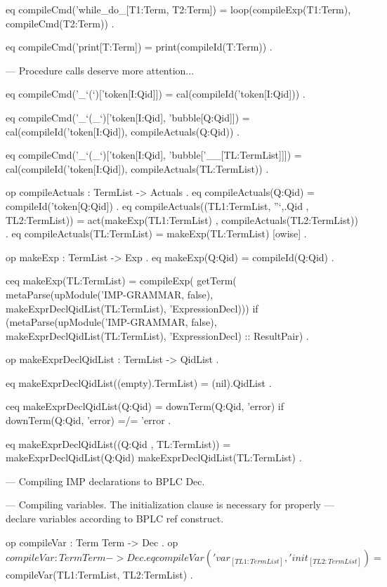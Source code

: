 \documentclass{llncs}%
\begin{document}
    eq compileCmd('while_do_[T1:Term, T2:Term]) =
           loop(compileExp(T1:Term), compileCmd(T2:Term)) .

    eq compileCmd('print[T:Term]) = print(compileId(T:Term)) .

    --- Procedure calls deserve more attention...

    eq compileCmd('_`(`)['token[I:Qid]]) =
       cal(compileId('token[I:Qid])) .

    eq compileCmd('_`(_`)['token[I:Qid], 'bubble[Q:Qid]]) =
       cal(compileId('token[I:Qid]), compileActuals(Q:Qid)) .

    eq compileCmd('_`(_`)['token[I:Qid], 'bubble['__[TL:TermList]]]) =
           cal(compileId('token[I:Qid]), compileActuals(TL:TermList)) .

    op compileActuals : TermList -> Actuals .
    eq compileActuals(Q:Qid) = compileId('token[Q:Qid]) .
    eq compileActuals((TL1:TermList, ''`,.Qid , TL2:TermList)) =
           act(makeExp(TL1:TermList) , compileActuals(TL2:TermList)) .
    eq compileActuals(TL:TermList) = makeExp(TL:TermList) [owise] .

    op makeExp : TermList -> Exp .
    eq makeExp(Q:Qid) = compileId(Q:Qid) .

    ceq makeExp(TL:TermList) =
            compileExp(
                 getTerm(
                  metaParse(upModule('IMP-GRAMMAR, false),
                   makeExprDeclQidList(TL:TermList), 'ExpressionDecl)))
    if (metaParse(upModule('IMP-GRAMMAR, false),
             makeExprDeclQidList(TL:TermList), 'ExpressionDecl) ::
            ResultPair) .

    op makeExprDeclQidList : TermList -> QidList .

    eq makeExprDeclQidList((empty).TermList) = (nil).QidList .

    ceq makeExprDeclQidList(Q:Qid) = downTerm(Q:Qid, 'error)
    if downTerm(Q:Qid, 'error) =/= 'error .

    eq makeExprDeclQidList((Q:Qid , TL:TermList)) =
           makeExprDeclQidList(Q:Qid) makeExprDeclQidList(TL:TermList) .

        --- Compiling IMP declarations to BPLC Dec.

    --- Compiling variables. The initialization clause is necessary for properly
        --- declare variables according to BPLC ref construct.

        op compileVar : Term Term -> Dec .
        op $compileVar : Term Term -> Dec .

    eq compileVar('var_[TL1:TermList], 'init_[TL2:TermList]) =
           $compileVar(TL1:TermList, TL2:TermList) .
\end{document}

